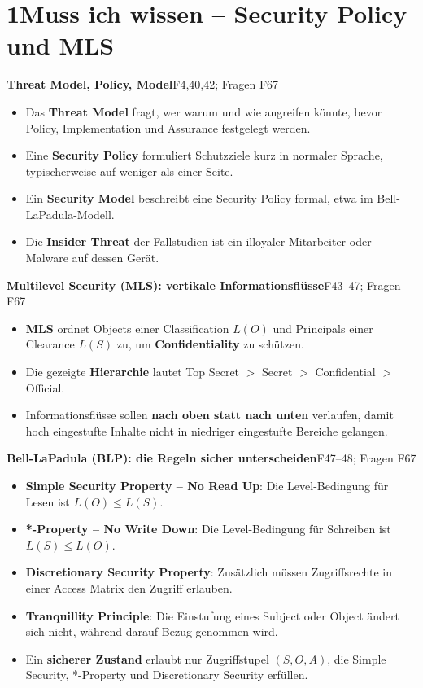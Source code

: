 \documentclass[11pt,a4paper]{article}
\newcommand{\block}[2]{\par\vspace{5pt}\textbf{#1}\hfill{\scriptsize #2}\par\nopagebreak}
\begin{document}
\section*{1\quad Muss ich wissen -- Security Policy und MLS}
\block{Threat Model, Policy, Model}{F4,40,42; Fragen F67}
\begin{itemize}
\item Das \textbf{Threat Model} fragt, wer warum und wie angreifen könnte, bevor Policy, Implementation und Assurance festgelegt werden.
\item Eine \textbf{Security Policy} formuliert Schutzziele kurz in normaler Sprache, typischerweise auf weniger als einer Seite.
\item Ein \textbf{Security Model} beschreibt eine Security Policy formal, etwa im Bell-LaPadula-Modell.
\item Die \textbf{Insider Threat} der Fallstudien ist ein illoyaler Mitarbeiter oder Malware auf dessen Gerät.
\end{itemize}
\block{Multilevel Security (MLS): vertikale Informationsflüsse}{F43--47; Fragen F67}
\begin{itemize}
\item \textbf{MLS} ordnet Objects einer Classification $L(O)$ und Principals einer Clearance $L(S)$ zu, um \textbf{Confidentiality} zu schützen.
\item Die gezeigte \textbf{Hierarchie} lautet Top Secret $>$ Secret $>$ Confidential $>$ Official.
\item Informationsflüsse sollen \textbf{nach oben statt nach unten} verlaufen, damit hoch eingestufte Inhalte nicht in niedriger eingestufte Bereiche gelangen.
\end{itemize}
\block{Bell-LaPadula (BLP): die Regeln sicher unterscheiden}{F47--48; Fragen F67}
\begin{itemize}
\item \textbf{Simple Security Property -- No Read Up}: Die Level-Bedingung für Lesen ist $L(O)\leq L(S)$.
\item \textbf{*-Property -- No Write Down}: Die Level-Bedingung für Schreiben ist $L(S)\leq L(O)$.
\item \textbf{Discretionary Security Property}: Zusätzlich müssen Zugriffsrechte in einer Access Matrix den Zugriff erlauben.
\item \textbf{Tranquillity Principle}: Die Einstufung eines Subject oder Object ändert sich nicht, während darauf Bezug genommen wird.
\item Ein \textbf{sicherer Zustand} erlaubt nur Zugriffstupel $(S,O,A)$, die Simple Security, *-Property und Discretionary Security erfüllen.
\end{itemize}
\end{document}
